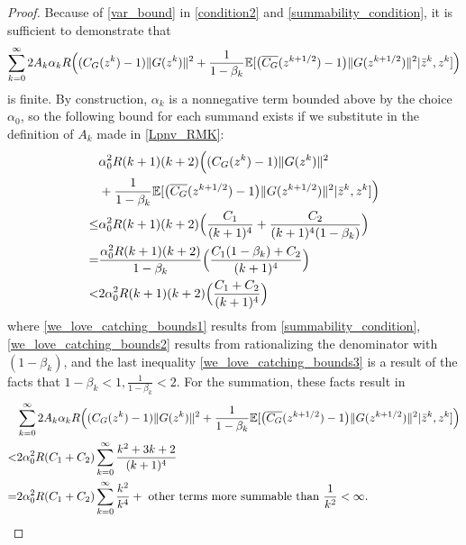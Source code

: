 \documentclass[11pt,reqno,oneside]{amsart}
\theoremstyle{definition}
\numberwithin{equation}{section}
\begin{document}
\begin{proof}
    Because of \eqref{var_bound} in \eqref{condition2} and \cref{summability_condition}, it is sufficient to demonstrate that
    \begin{equation}
        \sum_{k=0}^{\infty} 2A_{k}\alpha_{k}R\Big{(}(C_{G}(z^{k}) - 1)\|G(z^{k})\|^{2} + \frac{1}{1-\beta_{k}}\mathbb{E}[\big{(}\overline{C_{G}}(z^{k+1/2})-1\big{)}\|G(z^{k+1/2})\|^{2}|\bar{z}^{k},z^{k}]\Big{)}
    \end{equation}
    is finite.
    By construction, $\alpha_{k}$ is a nonnegative term bounded above by the choice $\alpha_{0}$, so the following bound for each summand exists if we substitute in the definition of $A_{k}$ made in \cref{Lpnv_RMK}:
    \begin{align}
        &\alpha_{0}^{2}R(k+1)(k+2)\Big{(}(C_{G}(z^{k}) - 1)\|G(z^{k})\|^{2} \notag \\
        & + \frac{1}{1-\beta_{k}}\mathbb{E}[\big{(}\overline{C_{G}}(z^{k+1/2})-1\big{)}\|G(z^{k+1/2})\|^{2}|\bar{z}^{k},z^{k}]\Big{)} \notag \\
        \leq&\alpha_{0}^{2}R(k+1)(k+2)\Big{(}\frac{C_{1}}{(k+1)^{4}} + \frac{C_{2}}{(k+1)^{4}(1 - \beta_{k})}\Big{)} \label{we_love_catching_bounds1} \\
        =&\frac{\alpha_{0}^{2}R(k+1)(k+2)}{1-\beta_{k}}\Big{(}\frac{C_{1}(1 - \beta_{k}) + C_{2}}{(k+1)^{4}}\Big{)} \label{we_love_catching_bounds2} \\
        <&2\alpha_{0}^{2}R(k+1)(k+2)\Big{(}\frac{C_{1} + C_{2}}{(k+1)^{4}}\Big{)} \label{we_love_catching_bounds3}
    \end{align}
    where \eqref{we_love_catching_bounds1} results from \cref{summability_condition}, \eqref{we_love_catching_bounds2} results from rationalizing the denominator with $(1-\beta_{k})$, and the last inequality \eqref{we_love_catching_bounds3} is a result of the facts that $1 - \beta_{k} < 1, \frac{1}{1 - \beta_{k}} < 2$.
    For the summation, these facts result in
    \begin{align*}
        &\sum_{k=0}^{\infty} 2A_{k}\alpha_{k}R\Big{(}(C_{G}(z^{k}) - 1)\|G(z^{k})\|^{2} + \frac{1}{1-\beta_{k}}\mathbb{E}[\big{(}\overline{C_{G}}(z^{k+1/2})-1\big{)}\|G(z^{k+1/2})\|^{2}|\bar{z}^{k},z^{k}]\Big{)} \\
        <& 2\alpha_{0}^{2}R(C_{1} + C_{2})\sum_{k=0}^{\infty} \frac{k^{2} + 3k + 2}{(k+1)^{4}}\\
        =& 2\alpha_{0}^{2}R(C_{1} + C_{2})\sum_{k=0}^{\infty} \frac{k^{2}}{k^{4}} + \text{ other terms more summable than } \frac{1}{k^{2}} < \infty.
    \end{align*}
\end{proof}
\end{document}
